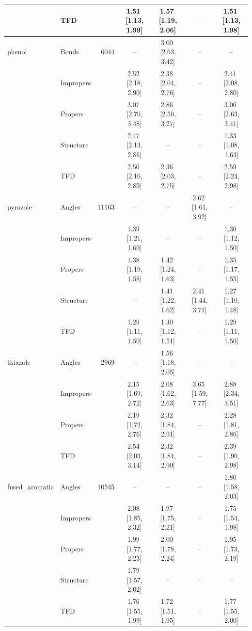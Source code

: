 \begin{longtable}[c]{ ll | r | c c c c}
     & TFD &  & 1.51\,\,[1.13, 1.99] & 1.57\,\,[1.19, 2.06] & -- & 1.51\,\,[1.13, 1.98] \\
    \hline
    phenol & Bonds & 6044 & -- & 3.00\,\,[2.63, 3.42] & -- & -- \\
     & Impropers &  & 2.52\,\,[2.18, 2.90] & 2.38\,\,[2.04, 2.76] & -- & 2.41\,\,[2.08, 2.80] \\
     & Propers &  & 3.07\,\,[2.70, 3.48] & 2.86\,\,[2.50, 3.27] & -- & 3.00\,\,[2.63, 3.41] \\
     & Structure &  & 2.47\,\,[2.13, 2.86] & -- & -- & 1.33\,\,[1.08, 1.63] \\
     & TFD &  & 2.50\,\,[2.16, 2.89] & 2.36\,\,[2.03, 2.75] & -- & 2.59\,\,[2.24, 2.98] \\
    \hline
    pyrazole & Angles & 11163 & -- & -- & 2.62\,\,[1.61, 3.92] & -- \\
     & Impropers &  & 1.39\,\,[1.21, 1.60] & -- & -- & 1.30\,\,[1.12, 1.50] \\
     & Propers &  & 1.38\,\,[1.19, 1.58] & 1.42\,\,[1.24, 1.63] & -- & 1.35\,\,[1.17, 1.55] \\
     & Structure &  & -- & 1.41\,\,[1.22, 1.62] & 2.41\,\,[1.44, 3.71] & 1.27\,\,[1.10, 1.48] \\
     & TFD &  & 1.29\,\,[1.11, 1.50] & 1.30\,\,[1.12, 1.51] & -- & 1.29\,\,[1.11, 1.50] \\
    \hline
    thiazole & Angles & 2969 & -- & 1.56\,\,[1.18, 2.05] & -- & -- \\
     & Impropers &  & 2.15\,\,[1.69, 2.72] & 2.08\,\,[1.62, 2.63] & 3.65\,\,[1.59, 7.77] & 2.88\,\,[2.34, 3.51] \\
     & Propers &  & 2.19\,\,[1.72, 2.76] & 2.32\,\,[1.84, 2.91] & -- & 2.28\,\,[1.81, 2.86] \\
     & TFD &  & 2.54\,\,[2.03, 3.14] & 2.32\,\,[1.84, 2.90] & -- & 2.39\,\,[1.90, 2.98] \\
    \hline
    fused\_aromatic & Angles & 10545 & -- & -- & -- & 1.80\,\,[1.58, 2.03] \\
     & Impropers &  & 2.08\,\,[1.85, 2.32] & 1.97\,\,[1.75, 2.21] & -- & 1.75\,\,[1.54, 1.98] \\
     & Propers &  & 1.99\,\,[1.77, 2.23] & 2.00\,\,[1.78, 2.24] & -- & 1.95\,\,[1.73, 2.19] \\
     & Structure &  & 1.79\,\,[1.57, 2.02] & -- & -- & -- \\
     & TFD &  & 1.76\,\,[1.55, 1.99] & 1.72\,\,[1.51, 1.95] & -- & 1.77\,\,[1.55, 2.00] \\
    \hline

\end{longtable}
